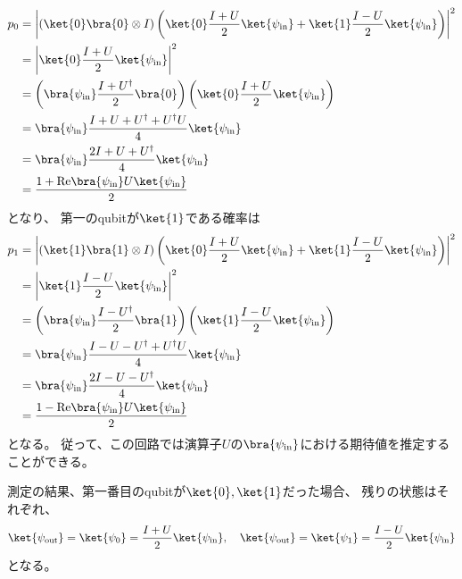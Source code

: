 \documentclass[]{ltjsarticle}
\renewcommand{\Re}{\mathrm{Re}}
\begin{document}
\begin{align}
    p_0
    &=
    \left|
        (\ket{0}\bra{0} \otimes I)
        \left(
            \ket{0}\frac{I + U}{2}\ket{\psi_\text{in}}
            +
            \ket{1}\frac{I - U}{2}\ket{\psi_\text{in}}
        \right)
    \right|^2 \\
    &=
    \left|
        \ket{0}\frac{I + U}{2}\ket{\psi_\text{in}}
    \right|^2 \\
    &=
    \left(
        \bra{\psi_\text{in}}\frac{I + U^\dagger}{2}\bra{0}
    \right)
    \left(
        \ket{0}\frac{I + U}{2}\ket{\psi_\text{in}}
    \right) \\
    &=
    \bra{\psi_\text{in}}
    \frac{I + U + U^\dagger + U^\dagger U}{4}
    \ket{\psi_\text{in}} \\
    &=
    \bra{\psi_\text{in}}
    \frac{2I + U + U^\dagger}{4}
    \ket{\psi_\text{in}} \\
    &=
    \frac{1 + \Re\bra{\psi_\text{in}}U\ket{\psi_\text{in}}}{2}
\end{align}
となり、
第一のqubitが$\ket{1}$である確率は
\begin{align}
    p_1
    &=
    \left|
        (\ket{1}\bra{1} \otimes I)
        \left(
            \ket{0}\frac{I + U}{2}\ket{\psi_\text{in}}
            +
            \ket{1}\frac{I - U}{2}\ket{\psi_\text{in}}
        \right)
    \right|^2 \\
    &=
    \left|
        \ket{1}\frac{I - U}{2}\ket{\psi_\text{in}}
    \right|^2 \\
    &=
    \left(
        \bra{\psi_\text{in}}\frac{I - U^\dagger}{2}\bra{1}
    \right)
    \left(
        \ket{1}\frac{I - U}{2}\ket{\psi_\text{in}}
    \right) \\
    &=
    \bra{\psi_\text{in}}
    \frac{I - U - U^\dagger + U^\dagger U}{4}
    \ket{\psi_\text{in}} \\
    &=
    \bra{\psi_\text{in}}
    \frac{2I - U - U^\dagger}{4}
    \ket{\psi_\text{in}} \\
    &=
    \frac{1 - \Re\bra{\psi_\text{in}}U\ket{\psi_\text{in}}}{2}
\end{align}
となる。
従って、この回路では演算子$U$の$\bra{\psi_\text{in}}$における期待値を推定することができる。

測定の結果、第一番目のqubitが$\ket{0}, \ket{1}$だった場合、
残りの状態はそれぞれ、
\begin{align}
    \ket{\psi_\text{out}}
    =
    \ket{\psi_0}
    =
    \frac{I + U}{2}
    \ket{\psi_\text{in}}, \quad
    \ket{\psi_\text{out}}
    =
    \ket{\psi_1}
    =
    \frac{I - U}{2}
    \ket{\psi_\text{in}}
\end{align}
となる。
\end{document}
